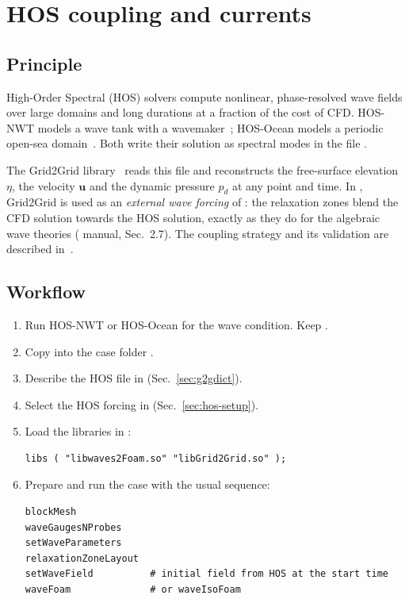 \chapter{HOS coupling and currents}
\label{ch:hos}

\section{Principle}
High-Order Spectral (HOS) solvers compute nonlinear, phase-resolved wave fields over large
domains and long durations at a fraction of the cost of CFD. HOS-NWT models a wave tank with
a wavemaker~\cite{ducrozet2012modified}; HOS-Ocean models a periodic open-sea
domain~\cite{ducrozet2016hosocean}. Both write their solution as spectral modes in the file
.

The Grid2Grid library~\cite{choi2019grid2grid} reads this file and reconstructs the free-surface
elevation $\eta$, the velocity $\mathbf u$ and the dynamic pressure $p_d$ at any point and time.
In \fwt{}, Grid2Grid is used as an \emph{external wave forcing} of \wtwof{}: the relaxation
zones blend the CFD solution towards the HOS solution, exactly as they do for the algebraic wave
theories (\wtwof{} manual, Sec.~2.7). The coupling strategy and its validation are described
in~\cite{aliyar2022numerical}.

\section{Workflow}
\begin{enumerate}
  \item Run HOS-NWT or HOS-Ocean for the wave condition. Keep
        .
  \item Copy  into the case folder .
  \item Describe the HOS file in  (Sec.~\ref{sec:g2gdict}).
  \item Select the HOS forcing in 
        (Sec.~\ref{sec:hos-setup}).
  \item Load the libraries in :
\begin{lstlisting}
libs ( "libwaves2Foam.so" "libGrid2Grid.so" );
\end{lstlisting}
  \item Prepare and run the case with the usual \wtwof{} sequence:
\begin{lstlisting}[style=shell,caption={Running an HOS-coupled case (shortened from \file{tutorials/waveFoam/Allrun}).}]
blockMesh
waveGaugesNProbes
setWaveParameters
relaxationZoneLayout
setWaveField          # initial field from HOS at the start time
waveFoam              # or waveIsoFoam
\end{lstlisting}
\end{enumerate}

